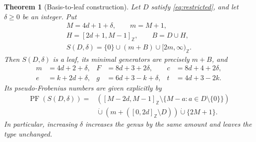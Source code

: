 \documentclass[11pt,letterpaper]{article}
\numberwithin{equation}{section}
\newtheorem{theorem}{Theorem}[section]
\theoremstyle{definition}
\theoremstyle{remark}
\newcommand{\Z}{\mathbb Z}
\newcommand{\ints}[2]{[#1,#2]_{\Z}}
\newcommand{\tail}[1]{[#1,\infty)_{\Z}}
\DeclareMathOperator{\PF}{PF}
\begin{document}
\begin{theorem}[Basis-to-leaf construction]\label{thm:basis}
Let $D$ satisfy \eqref{eq:restricted}, and let $\delta\ge0$ be an integer. Put
\begin{equation}\label{eq:construction}
 \begin{gathered}
 M=4d+1+\delta,\qquad m=M+1,\\
 H=\ints{2d+1}{M-1},\qquad B=D\cup H,\\
 S(D,\delta)=\{0\}\cup(m+B)\cup\tail{2m}.
 \end{gathered}
\end{equation}
Then $S(D,\delta)$ is a leaf, its minimal generators are precisely $m+B$, and
\begin{align}
 m&=4d+2+\delta,&F&=8d+3+2\delta,&c&=8d+4+2\delta,
 \label{eq:familymF}\\
 e&=k+2d+\delta,&g&=6d+3-k+\delta,&t&=4d+3-2k.
 \label{eq:familygt}
\end{align}
Its pseudo-Frobenius numbers are given explicitly by
\begin{align}\label{eq:familyPF}
 \PF(S(D,\delta))={}&
 \left(\ints{M-2d}{M-1}\setminus
       \{M-a:a\in D\setminus\{0\}\}\right)\nonumber\\
 &{}\mathbin{\dot\cup}\left(m+(\ints{0}{2d}\setminus D)\right)
   \mathbin{\dot\cup}\{2M+1\}.
\end{align}
In particular, increasing $\delta$ increases the genus by the same amount
and leaves the type unchanged.
\end{theorem}
\end{document}
